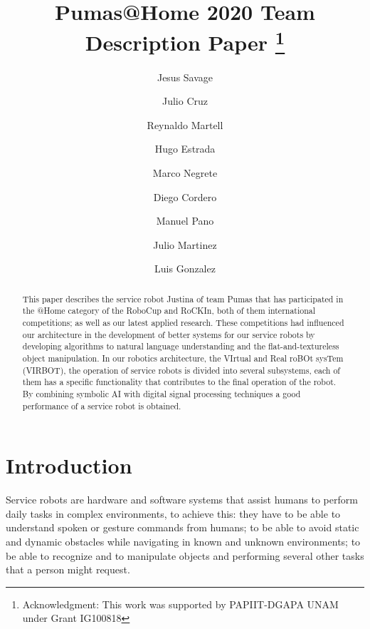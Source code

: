 \documentclass{llncs}
\begin{document}
\title{Pumas@Home 2020 Team Description Paper
\thanks{Acknowledgment: This work was supported by PAPIIT-DGAPA UNAM under Grant IG100818}}
\author{
	Jesus Savage 
	\and Julio Cruz 
	\and Reynaldo Martell 
	\and Hugo Estrada 
	\and Marco Negrete 
	\and Diego Cordero
	\and Manuel Pano
	\and Julio Martinez
	\and Luis Gonzalez
}
\maketitle


\begin{abstract}

This paper describes the service robot Justina of team Pumas that has participated in the @Home category of the RoboCup and RoCKIn, both of them international competitions; as well as our latest applied research. These competitions had influenced our architecture in the development of better systems for our service robots by developing algorithms to natural language understanding and the flat-and-textureless object manipulation.
In our robotics architecture, the VIrtual and Real roBOt sysTem (VIRBOT), the operation of service robots is divided into several subsystems, each of them has a specific functionality  that contributes to the final operation of the robot.
By combining symbolic AI with digital signal processing techniques a good performance of a service robot is obtained.

\end{abstract}


\section{Introduction}

Service robots are hardware and software systems that assist humans to perform daily tasks in complex environments, to achieve this: they have to be able to understand spoken or gesture commands from humans; to be able to avoid static and dynamic obstacles while navigating in known and unknown environments; to be able to recognize and to manipulate objects and performing several other tasks that a person might request. 
\end{document}
